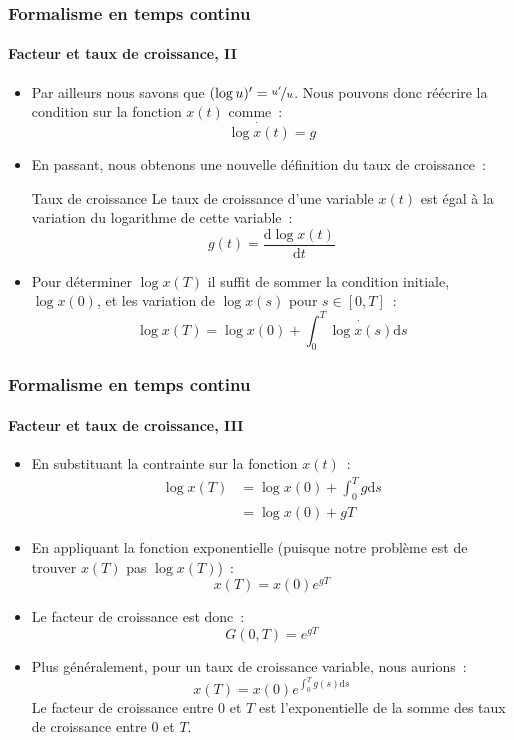 \documentclass[10pt,notheorems]{beamer}
\theoremstyle{plain}
\theoremstyle{definition} %
\begin{document}
\begin{frame}
  \frametitle{Formalisme en temps continu}
  \framesubtitle{Facteur et taux de croissance, II}

  \begin{itemize}

  \item Par ailleurs nous savons que $ (\log u)' = \nicefrac{u'}{u}$. Nous pouvons donc réécrire la condition sur la fonction $x(t)$ comme~:
    \[
      \dot{\log x(t)} = g
    \]

  \item En passant, nous obtenons une nouvelle définition du taux de croissance~:

    \begin{block}{Taux de croissance}
      Le taux de croissance d'une variable $x(t)$ est égal à la variation du logarithme de cette variable~:
      \[
        g(t) = \frac{\mathrm d \log x(t)}{\mathrm dt}
      \]
    \end{block}

  \item Pour déterminer $\log x(T)$ il suffit de sommer la condition initiale, $\log x(0)$, et les variation de $\log x(s)$ pour $s\in[0,T]$~:
    \[
      \log x(T) = \log x(0) + \int_0^T \dot{\log x(s)}\mathrm d s
    \]
  \end{itemize}

\end{frame}


\begin{frame}
  \frametitle{Formalisme en temps continu}
  \framesubtitle{Facteur et taux de croissance, III}

  \begin{itemize}

  \item En substituant la contrainte sur la fonction $x(t)$~:
    \[
      \begin{split}
        \log x(T) &= \log x(0) + \int_0^T g\mathrm d s\\
        &= \log x(0) + gT
      \end{split}
    \]

  \item En appliquant la fonction exponentielle (puisque notre problème est de trouver $x(T)$ pas $\log x(T)$)~:
    \[
      x(T) = x(0)e^{gT}
    \]

  \item Le facteur de croissance est donc~:
    \[
      G(0,T) = e^{gT}
    \]

  \item Plus généralement, pour un taux de croissance variable, nous aurions~:
    \[
      x(T) = x(0)e^{\int_0^Tg(s)\mathrm ds}
    \]
    Le facteur de croissance entre 0 et $T$ est l'exponentielle de la somme des taux de croissance entre $0$ et $T$.

  \end{itemize}

\end{frame}
\end{document}
